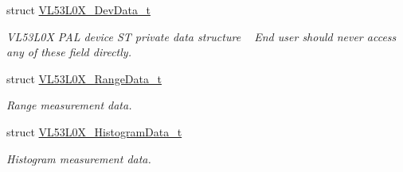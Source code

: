 \begin{DoxyCompactItemize}
struct \hyperlink{structVL53L0X__DevData__t}{V\+L53\+L0\+X\+\_\+\+Dev\+Data\+\_\+t}
\begin{DoxyCompactList}\small\item\em V\+L53\+L0X P\+AL device ST private data structure ~\newline
End user should never access any of these field directly. \end{DoxyCompactList}\item 
struct \hyperlink{structVL53L0X__RangeData__t}{V\+L53\+L0\+X\+\_\+\+Range\+Data\+\_\+t}
\begin{DoxyCompactList}\small\item\em Range measurement data. \end{DoxyCompactList}\item 
struct \hyperlink{structVL53L0X__HistogramData__t}{V\+L53\+L0\+X\+\_\+\+Histogram\+Data\+\_\+t}
\begin{DoxyCompactList}\small\item\em Histogram measurement data. \end{DoxyCompactList}\end{DoxyCompactItemize}
